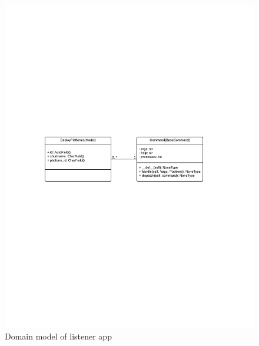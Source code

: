 \documentclass[thesis=B,english]{FITthesis}[2013/04/26]
\begin{document}
\begin{figure}[h!]
	\advance\leftskip 0cm
	\includegraphics[trim=3cm 12cm 3cm 4cm, clip=true, totalheight=300pt]{images/back_listener.pdf}
	\caption{Domain model of listener app}
\end{figure}
\end{document}
